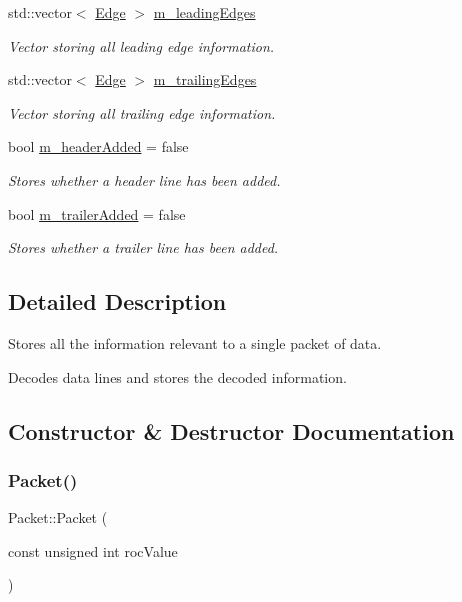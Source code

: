 \begin{DoxyCompactItemize}
std\+::vector$<$ \hyperlink{class_edge}{Edge} $>$ \hyperlink{class_packet_afea7ea47b52850e2f68b237036ceb3e1}{m\+\_\+leading\+Edges}
\begin{DoxyCompactList}\small\item\em Vector storing all leading edge information. \end{DoxyCompactList}\item 
std\+::vector$<$ \hyperlink{class_edge}{Edge} $>$ \hyperlink{class_packet_a0a91b78992e75fd203a187dcb34a81c1}{m\+\_\+trailing\+Edges}
\begin{DoxyCompactList}\small\item\em Vector storing all trailing edge information. \end{DoxyCompactList}\item 
bool \hyperlink{class_packet_aaf9fa3ad2c94bec82a748366fb00ecc7}{m\+\_\+header\+Added} = false
\begin{DoxyCompactList}\small\item\em Stores whether a header line has been added. \end{DoxyCompactList}\item 
bool \hyperlink{class_packet_a046581698cdcca7297109ceaeed7e014}{m\+\_\+trailer\+Added} = false
\begin{DoxyCompactList}\small\item\em Stores whether a trailer line has been added. \end{DoxyCompactList}\end{DoxyCompactItemize}


\subsection{Detailed Description}
Stores all the information relevant to a single packet of data. 

Decodes data lines and stores the decoded information. 

\subsection{Constructor \& Destructor Documentation}
\mbox{\label{class_packet_a4b142794d6864d4d7949ba5e800ee1be}} 
\subsubsection{\texorpdfstring{Packet()}{Packet()}}
{\footnotesize\ttfamily Packet\+::\+Packet (\begin{DoxyParamCaption}\item[{const unsigned int}]{roc\+Value }\end{DoxyParamCaption})}



